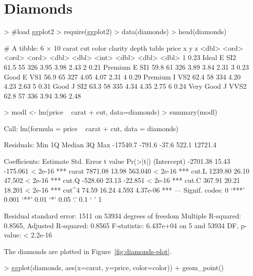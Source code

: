 \documentclass{article}
\begin{document}
\section{Diamonds}
\label{sec:Diamonds}
\begin{Schunk}
\begin{Sinput}
> #load ggplot2
> require(ggplot2)
> data(diamonds)
> head(diamonds)
\end{Sinput}
\begin{Soutput}
# A tibble: 6 × 10
  carat       cut color clarity depth table price     x     y     z
  <dbl>     <ord> <ord>   <ord> <dbl> <dbl> <int> <dbl> <dbl> <dbl>
1  0.23     Ideal     E     SI2  61.5    55   326  3.95  3.98  2.43
2  0.21   Premium     E     SI1  59.8    61   326  3.89  3.84  2.31
3  0.23      Good     E     VS1  56.9    65   327  4.05  4.07  2.31
4  0.29   Premium     I     VS2  62.4    58   334  4.20  4.23  2.63
5  0.31      Good     J     SI2  63.3    58   335  4.34  4.35  2.75
6  0.24 Very Good     J    VVS2  62.8    57   336  3.94  3.96  2.48
\end{Soutput}
\begin{Sinput}
> modl <- lm(price ~ carat + cut, data=diamonds)
> summary(modl)
\end{Sinput}
\begin{Soutput}
Call:
lm(formula = price ~ carat + cut, data = diamonds)

Residuals:
     Min       1Q   Median       3Q      Max 
-17540.7   -791.6    -37.6    522.1  12721.4 

Coefficients:
            Estimate Std. Error  t value Pr(>|t|)    
(Intercept) -2701.38      15.43 -175.061  < 2e-16 ***
carat        7871.08      13.98  563.040  < 2e-16 ***
cut.L        1239.80      26.10   47.502  < 2e-16 ***
cut.Q        -528.60      23.13  -22.851  < 2e-16 ***
cut.C         367.91      20.21   18.201  < 2e-16 ***
cut^4          74.59      16.24    4.593 4.37e-06 ***
---
Signif. codes:  0 ‘***’ 0.001 ‘**’ 0.01 ‘*’ 0.05 ‘.’ 0.1 ‘ ’ 1

Residual standard error: 1511 on 53934 degrees of freedom
Multiple R-squared:  0.8565,	Adjusted R-squared:  0.8565 
F-statistic: 6.437e+04 on 5 and 53934 DF,  p-value: < 2.2e-16
\end{Soutput}
\end{Schunk}

The diamonds are plotted in Figure~\ref{fig:diamonds-plot}.
\begin{Schunk}
\begin{Sinput}
> ggplot(diamonds, aes(x=carat, y=price, color=color)) + geom_point()
\end{Sinput}
\end{Schunk}
\end{document}
